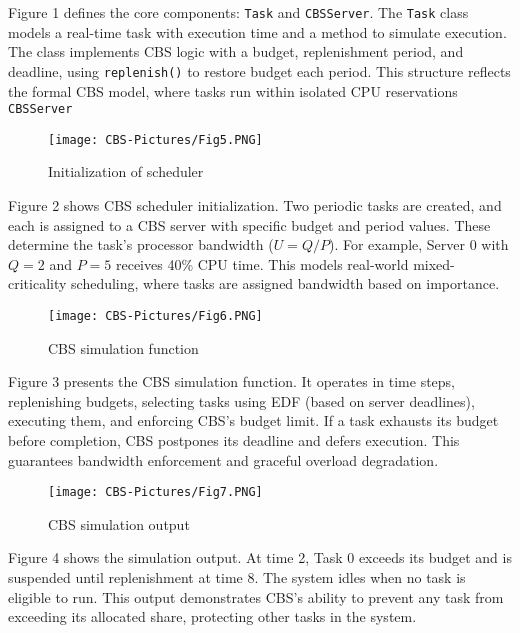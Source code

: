 \documentclass[conference]{IEEEtran}
\begin{document}
\noindent
Figure 1 defines the core components: \texttt{Task} and \texttt{CBSServer}. The \texttt{Task} class models a real-time task with execution time and a method to simulate execution. The class implements CBS logic with a budget, replenishment period, and deadline, using \texttt{replenish()} to restore budget each period. This structure reflects the formal CBS model, where tasks run within isolated CPU reservations
\texttt{CBSServer} 
\vspace{0.1cm}
\begin{figure}[h]
  \centering
  \texttt{[image: CBS-Pictures/Fig5.PNG]}
  \caption{Initialization of scheduler }
  \label{fig:image_label}
\end{figure}


\noindent
Figure 2 shows CBS scheduler initialization. Two periodic tasks are created, and each is assigned to a CBS server with specific budget and period values. These determine the task's processor bandwidth (\(U = Q/P\)). For example, Server 0 with \(Q=2\) and \(P=5\) receives 40\% CPU time. This models real-world mixed-criticality scheduling, where tasks are assigned bandwidth based on importance.

\vspace{0.1cm}
\begin{figure}[h]
  \centering
  \texttt{[image: CBS-Pictures/Fig6.PNG]}
  \caption{CBS simulation function }
  \label{fig:image_label}
\end{figure}

\noindent
Figure 3 presents the CBS simulation function. It operates in time steps, replenishing budgets, selecting tasks using EDF (based on server deadlines), executing them, and enforcing CBS’s budget limit. If a task exhausts its budget before completion, CBS postpones its deadline and defers execution. This guarantees bandwidth enforcement and graceful overload degradation.

\vspace{0.1cm}
\begin{figure}[h]
  \centering
  \texttt{[image: CBS-Pictures/Fig7.PNG]}
  \caption{CBS simulation output }
  \label{fig:image_label}
\end{figure}

\noindent
Figure 4 shows the simulation output. At time 2, Task 0 exceeds its budget and is suspended until replenishment at time 8. The system idles when no task is eligible to run. This output demonstrates CBS’s ability to prevent any task from exceeding its allocated share, protecting other tasks in the system.
\end{document}
